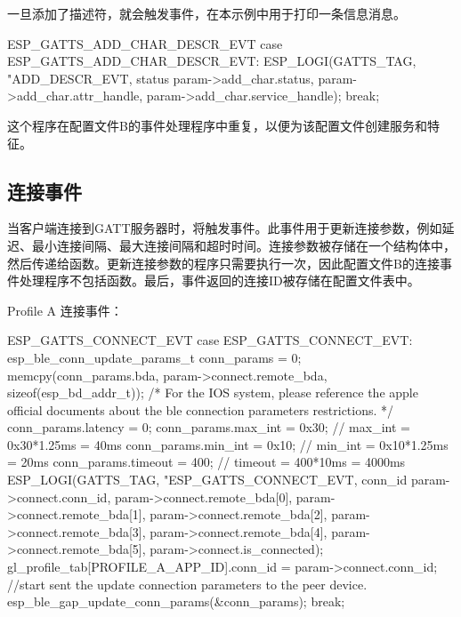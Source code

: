 \documentclass[lang=cn,newtx,10pt,scheme=chinese]{elegantbook}
\begin{document}
一旦添加了描述符，就会触发事件，在本示例中用于打印一条信息消息。

\begin{mycode}{ESP\_GATTS\_ADD\_CHAR\_DESCR\_EVT}
    case ESP_GATTS_ADD_CHAR_DESCR_EVT:
         ESP_LOGI(GATTS_TAG, "ADD_DESCR_EVT, status %
                  param->add_char.status, param->add_char.attr_handle,  
                  param->add_char.service_handle);
         break;
\end{mycode}

这个程序在配置文件B的事件处理程序中重复，以便为该配置文件创建服务和特征。

\subsection{连接事件}

当客户端连接到GATT服务器时，将触发事件。此事件用于更新连接参数，例如延迟、最小连接间隔、最大连接间隔和超时时间。连接参数被存储在一个结构体中，然后传递给函数。更新连接参数的程序只需要执行一次，因此配置文件B的连接事件处理程序不包括函数。最后，事件返回的连接ID被存储在配置文件表中。

Profile A 连接事件：

\begin{mycode}{ESP\_GATTS\_CONNECT\_EVT}
case ESP_GATTS_CONNECT_EVT: {  
     esp_ble_conn_update_params_t conn_params = {0};  
     memcpy(conn_params.bda, param->connect.remote_bda, sizeof(esp_bd_addr_t));
     /* For the IOS system, please reference the apple official documents about the ble connection parameters restrictions. */
     conn_params.latency = 0;  
     conn_params.max_int = 0x30;    // max_int = 0x30*1.25ms = 40ms  
     conn_params.min_int = 0x10;    // min_int = 0x10*1.25ms = 20ms   
     conn_params.timeout = 400;     // timeout = 400*10ms = 4000ms  
     ESP_LOGI(GATTS_TAG, "ESP_GATTS_CONNECT_EVT, conn_id %
             param->connect.conn_id,  
             param->connect.remote_bda[0],  
             param->connect.remote_bda[1],  
             param->connect.remote_bda[2],  
             param->connect.remote_bda[3],  
             param->connect.remote_bda[4],  
             param->connect.remote_bda[5],  
             param->connect.is_connected);
     gl_profile_tab[PROFILE_A_APP_ID].conn_id = param->connect.conn_id;
     //start sent the update connection parameters to the peer device.
     esp_ble_gap_update_conn_params(&conn_params);
     break;
    }
\end{mycode}
\end{document}
